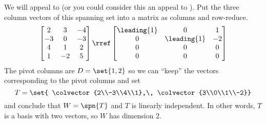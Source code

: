 We will appeal to  (or you could consider this an appeal to ).  Put the three column vectors of this spanning set into a matrix as columns and row-reduce.
%
\begin{equation*}
\begin{bmatrix}
 2 & 3 & -4 \\
 -3 & 0 & -3 \\
 4 & 1 & 2 \\
 1 & -2 & 5
\end{bmatrix}
\rref
\begin{bmatrix}
 \leading{1} & 0 & 1 \\
 0 & \leading{1} & -2 \\
 0 & 0 & 0 \\
 0 & 0 & 0
\end{bmatrix}
\end{equation*}
%
The pivot columns are $D=\set{1,2}$ so we can ``keep'' the vectors corresponding to the pivot columns and set
%
\begin{equation*}
T=\set{
\colvector{2\\-3\\4\\1},\,
\colvector{3\\0\\1\\-2}}
\end{equation*}
%
and conclude that $W=\spn{T}$ and $T$ is linearly independent.  In other words, $T$ is a basis with two vectors, so $W$ has dimension 2.
